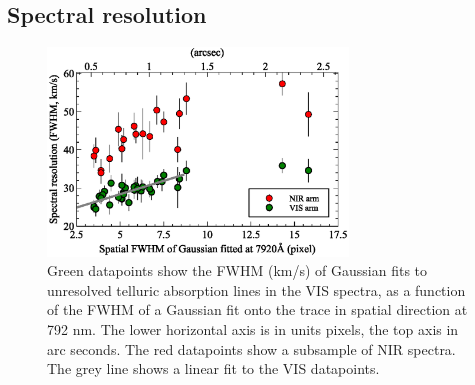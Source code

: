 \documentclass{aa}    %
\begin{document}
                                                                                           
\subsection{Spectral resolution} \label{resolution}


\begin{figure}[!ht]
	\centerline{\includegraphics[width=8cm]{figures/resolution_paper.eps}}
	\caption{Green datapoints show the FWHM (km/s) of Gaussian fits to unresolved telluric absorption lines in the VIS spectra, as a function of the FWHM of a Gaussian fit onto the trace in spatial direction at  792 nm. The lower horizontal axis is in units pixels, the top axis in arc seconds. The red datapoints show a subsample of NIR spectra.
		The grey line shows a linear fit to the VIS datapoints. }
	\label{fig:res}
\end{figure}
\end{document}
